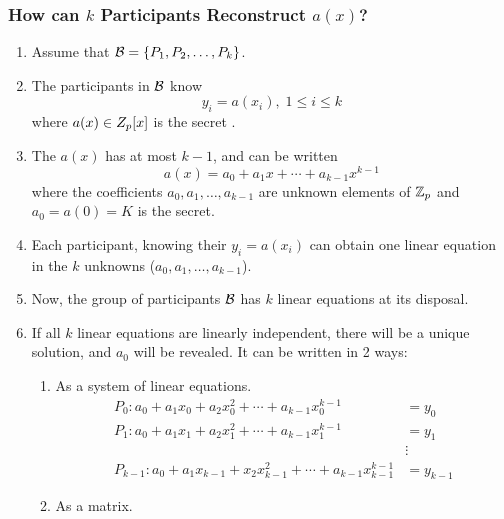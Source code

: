 \subsubsection{\texorpdfstring{How can $k$ Participants Reconstruct $a(x)$?}{Successfully Reconstruct the Key}}\label{subsubsec:How_k_Participants_Reconstruct}
\begin{enumerate}[noitemsep]
\item Assume that $\operatorname{\mathcal{B}} = \lbrace P_{1}, P_{2}, \ldots, P_{k} \rbrace$.
\item The participants in $\operatorname{\mathcal{B}}$ know
  \begin{equation*}
    y_{i} = a(x_{i}), \; 1 \leq i \leq k
  \end{equation*}
  where $a(x) \in Z_{p}[x]$ is the secret .
\item The  $a(x)$ has  at most $k-1$, and can be written
  \begin{equation*}
    a(x) = a_{0} + a_{1}x + \cdots + a_{k-1} x^{k-1}
  \end{equation*}
  where the coefficients $a_{0}, a_{1}, \ldots, a_{k-1}$ are unknown elements of $\operatorname{\mathbb{Z}}_{p}$ and $a_{0} = a(0) = K$ is the secret.
\item Each participant, knowing their $y_{i} = a(x_{i})$ can obtain one linear equation in the $k$ unknowns ($a_{0}, a_{1}, \ldots, a_{k-1}$).
\item Now, the group of participants $\operatorname{\mathcal{B}}$ has $k$ linear equations at its disposal.
\item If all $k$ linear equations are linearly independent, there will be a unique solution, and $a_{0}$ will be revealed. It can be written in 2 ways:
  \begin{enumerate}[noitemsep]
  \item As a system of linear equations.
    \begin{align*}
      P_{0} : a_{0} + a_{1}x_{0} + a_{2}x_{0}^{2} + \cdots + a_{k-1}x_{0}^{k-1} &= y_{0} \\
      P_{1} : a_{0} + a_{1}x_{1} + a_{2}x_{1}^{2} + \cdots + a_{k-1}x_{1}^{k-1} &= y_{1} \\
       &\vdots \\
      P_{k-1} : a_{0} + a_{1}x_{k-1} + x_{2}x_{k-1}^{2} + \cdots + a_{k-1}x_{k-1}^{k-1} &= y_{k-1}
    \end{align*}
  \item As a matrix.
    \begin{equation*}

\end{equation*}
\end{enumerate}
\end{enumerate}
